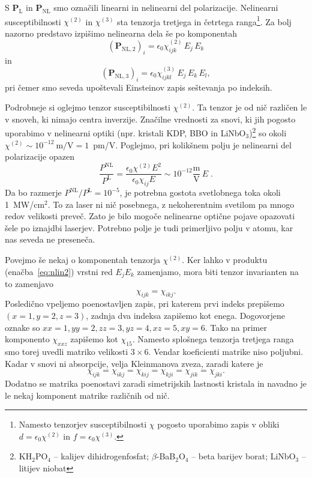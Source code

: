 \documentclass[11pt,fleqn]{book} %
\newcommand{\beq}{\begin{equation}}
\newcommand{\eeq}{\end{equation}}
\begin{document}
S $\mathbf{P}_{\mathrm{L}}$ in $\mathbf{P}_{\mathrm{NL}}$ smo označili linearni in nelinearni
del polarizacije. Nelinearni susceptibilnosti $\chi^{(2)}$ in $\chi^{(3)}$
sta tenzorja tretjega in četrtega ranga\footnote{Namesto tenzorjev susceptibilnosti $\chi$
pogosto uporabimo zapis v obliki $d=\epsilon_{0}\chi^{(2)}$ in $f=
\epsilon_{0}\chi^{(3)}$.}. Za bolj nazorno predstavo izpišimo nelinearna dela še po komponentah
\beq
\left(\mathbf{P}_{\mathrm{NL,2}}\right)_i= \epsilon_{0}\chi^{(2)}_{ijk} \,E_j \,E_k
\label{eq:nlin2}
\eeq
in 
\beq
\left(\mathbf{P}_{\mathrm{NL,3}}\right)_i= \epsilon_{0}\chi^{(3)}_{ijkl} \,E_j \,E_k\, E_l,
\eeq
pri čemer smo seveda upoštevali Einsteinov zapis seštevanja po indeksih. 


Podrobneje si oglejmo tenzor susceptibilnosti $\chi^{(2)}$. 
Ta tenzor je od nič različen le v snoveh, ki nimajo centra inverzije. Značilne 
vrednosti za snovi, ki jih pogosto uporabimo v nelinearni optiki (npr. kristali 
KDP, BBO in LiNbO$_3$)\footnote{KH$_2$PO$_4$ -- kalijev dihidrogenfosfat; $\beta$-BaB$_2$O$_4$ --
beta barijev borat; LiNbO$_3$ -- litijev niobat} so okoli $\chi^{(2)} 
\sim 10^{-12}~\textrm{m/V} = 1$~pm/V.
Poglejmo, pri kolikšnem polju je nelinearni del polarizacije opazen
\begin{equation}
\frac{P^{\mathrm{NL}}}{P^{\mathrm{L}}}=\frac{\epsilon_{0} \chi^{(2)} E^2}{\epsilon_{0}\chi_{ij} E} \sim 10^{-12}\frac{\mbox{m}}{\mbox{V}}\, E\;.
\label{8.2}
\end{equation}
Da bo razmerje $P^{\mathrm{NL}}/P^{\mathrm{L}} =10^{-5}$, je potrebna gostota 
svetlobnega toka okoli 1~MW/cm$^{2}$. To za laser ni nič posebnega, z nekoherentnim
svetilom pa mnogo redov velikosti preveč. Zato je bilo mogoče nelinearne
optične pojave opazovati šele po iznajdbi laserjev. Potrebno polje
je tudi primerljivo polju v atomu, kar nas seveda ne preseneča. 


Povejmo še nekaj o komponentah tenzorja $\chi^{(2)}$. 
Ker lahko v produktu (enačba~\ref{eq:nlin2}) vrstni red $E_j E_k$ zamenjamo, mora biti
tenzor invarianten na to zamenjavo
\beq
\chi_{ijk} = \chi_{ikj}.
\eeq
Posledično vpeljemo poenostavljen zapis, pri katerem prvi indeks prepišemo $(x = 1, y = 2, z = 3)$,
zadnja dva indeksa zapišemo kot enega. Dogovorjene oznake so $xx = 1, yy = 2, zz = 3, yz = 4, 
xz = 5, xy = 6$. Tako na primer komponento $\chi_{xxz}$ zapišemo kot $\chi_{15}$. Namesto
splošnega tenzorja tretjega ranga smo torej uvedli matriko velikosti $3\times6$. 
Vendar koeficienti matrike niso poljubni. Kadar v snovi ni absorpcije, velja Kleinmanova 
zveza, zaradi katere je 
\beq
\chi_{ijk} = \chi_{ikj} = \chi_{kij} = \chi_{kji} = \chi_{jik} = \chi_{jki}.
\eeq
Dodatno se matrika poenostavi zaradi simetrijskih lastnosti kristala in navadno je 
le nekaj komponent matrike različnih od nič. 
\end{document}
